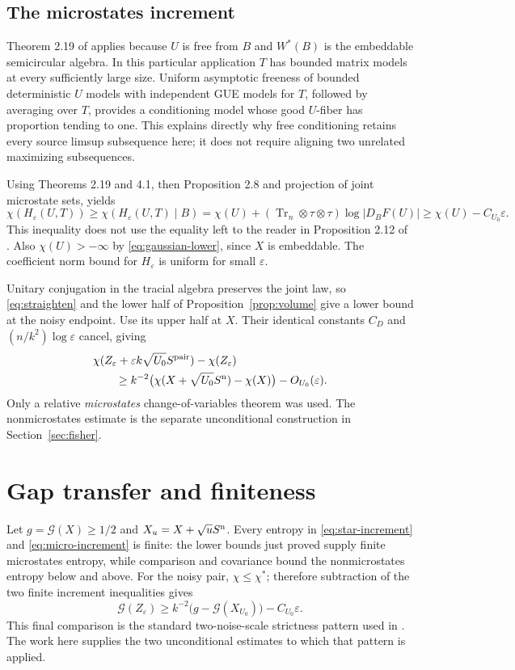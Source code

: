 \documentclass[11pt]{article}
\theoremstyle{definition}\newtheorem{definition}[theorem]{Definition}
\theoremstyle{remark}\newtheorem{remark}[theorem]{Remark}
\DeclareMathOperator{\Tr}{Tr}\DeclareMathOperator{\tr}{tr}
\newcommand{\eps}{\varepsilon}\newcommand{\id}{\mathrm{id}}
\newcommand{\gap}{\mathcal G}\newcommand{\Enc}{E_{\eps}}
\begin{document}
\subsection{The microstates increment}
Theorem 2.19 of \cite{Shly} applies because $U$ is free from $B$ and
$W^*(B)$ is the embeddable semicircular algebra. In this particular
application $T$ has bounded matrix models at every sufficiently large
size. Uniform asymptotic freeness of bounded deterministic $U$ models
with independent GUE models for $T$, followed by averaging over $T$,
provides a conditioning model whose good $U$-fiber has proportion
tending to one. This explains directly why free conditioning retains
every source limsup subsequence here; it does not require aligning two
unrelated maximizing subsequences.

Using Theorems 2.19 and 4.1, then Proposition 2.8 and projection of
joint microstate sets, yields
\begin{equation}\label{eq:H-entropy}
 \chi(H_\eps(U,T))\geq\chi(H_\eps(U,T)\mid B)
 =\chi(U)+(\Tr_n\otimes\tau\otimes\tau)\log|D_BF(U)|
 \geq\chi(U)-C_{U_0}\eps.
\end{equation}
This inequality does not use the equality left to the reader in
Proposition 2.12 of \cite{Shly}. Also $\chi(U)>-\infty$ by
\eqref{eq:gaussian-lower}, since $X$ is embeddable.
The coefficient norm bound for $H_\eps$ is uniform for small $\eps$.

Unitary conjugation in the tracial algebra preserves the joint law,
so \eqref{eq:straighten} and the lower half of
Proposition~\ref{prop:volume} give a lower bound at the noisy endpoint.
Use its upper half at $X$. Their identical constants $C_D$ and
$(n/k^2)\log\eps$ cancel, giving
\begin{align}
 &\chi(Z_\eps+\eps k\sqrt{U_0}S^{\rm pair})-\chi(Z_\eps)
 \notag\\
 &\qquad\geq k^{-2}\big(\chi(X+\sqrt{U_0}S^{\rm n})-\chi(X)\big)
                   -O_{U_0}(\eps).
 \label{eq:micro-increment}
\end{align}
Only a relative \emph{microstates} change-of-variables theorem was
used. The nonmicrostates estimate is the separate unconditional
construction in Section~\ref{sec:fisher}.

\section{Gap transfer and finiteness}
\label{sec:finish}
Let $g=\gap(X)\geq1/2$ and $X_u=X+\sqrt u S^{\rm n}$.
Every entropy in \eqref{eq:star-increment} and
\eqref{eq:micro-increment} is finite: the lower bounds just proved
supply finite microstates entropy, while comparison and covariance
bound the nonmicrostates entropy below and above.
For the noisy pair, $\chi\leq\chi^*$; therefore subtraction of the
two finite increment inequalities gives
\begin{equation}\label{eq:gap-bound}
 \gap(Z_\eps)\geq k^{-2}\big(g-\gap(X_{U_0})\big)-C_{U_0}\eps.
\end{equation}
This final comparison is the standard two-noise-scale strictness
pattern used in \cite{source298}. The work here supplies the two
unconditional estimates to which that pattern is applied.
\end{document}
